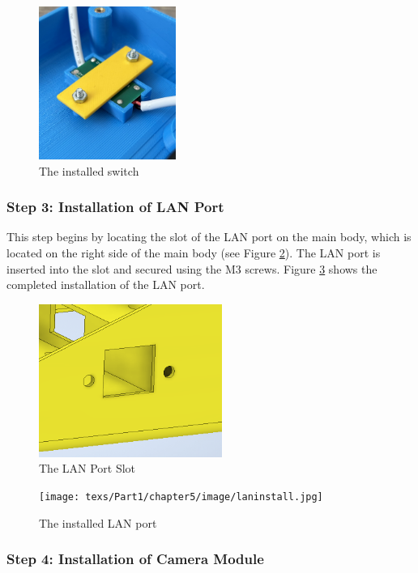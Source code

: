 \begin{figure}[!ht]
    \centering
    \includegraphics[height=5cm]{texs/Part1/chapter5/image/switchinstall.jpg}
    \caption{The installed switch}
    \label{fig:switchinstall}
\end{figure}

\subsubsection{Step 3: Installation of LAN Port}

This step begins by locating the slot of the LAN port on the main body, which is located on the right side of the main body (see Figure \ref{fig:lanslot}). The LAN port is inserted into the slot and secured using the M3 screws. Figure \ref{fig:laninstall} shows the completed installation of the LAN port.

\begin{figure}[!ht]
    \centering
    \includegraphics[height=5cm]{texs/Part1/chapter5/image/lanslot.png}
    \caption{The LAN Port Slot}
    \label{fig:lanslot}
\end{figure}

\begin{figure}[!ht]
    \centering
    \texttt{[image: texs/Part1/chapter5/image/laninstall.jpg]}
    \caption{The installed LAN port}
    \label{fig:laninstall}
\end{figure}

\subsubsection{Step 4: Installation of Camera Module}

